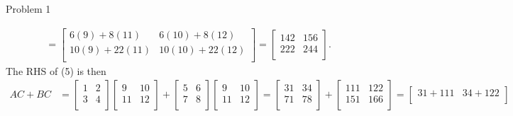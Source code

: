 \begin{problem}{Problem 1}
\begin{Highlight}[Solution]
\begin{align*}
            & = 
            \begin{bmatrix}
                6(9) + 8(11) & 6(10) + 8(12) \\
                10(9) + 22(11) & 10(10) + 22(12) \\
            \end{bmatrix}
            = 
            \begin{bmatrix}
                142 & 156 \\
                222 & 244 \\
            \end{bmatrix}.
        \end{align*}
        The RHS of (5) is then
        \begin{align*}
            AC + BC & = 
            \begin{bmatrix}
                1 & 2 \\
                3 & 4 \\
            \end{bmatrix}
            \begin{bmatrix}
                9 & 10 \\
                11 & 12 \\
            \end{bmatrix}
            +
            \begin{bmatrix}
                5 & 6 \\
                7 & 8 \\
            \end{bmatrix}
            \begin{bmatrix}
                9 & 10 \\
                11 & 12 \\
            \end{bmatrix}
            = 
            \begin{bmatrix}
                31 & 34 \\
                71 & 78 \\
            \end{bmatrix}
            + 
            \begin{bmatrix}
                111 & 122 \\
                151 & 166 \\
            \end{bmatrix}
            = 
            \begin{bmatrix}
                31 + 111 & 34 + 122 \\

\end{bmatrix}
\end{align*}
\end{Highlight}
\end{problem}

